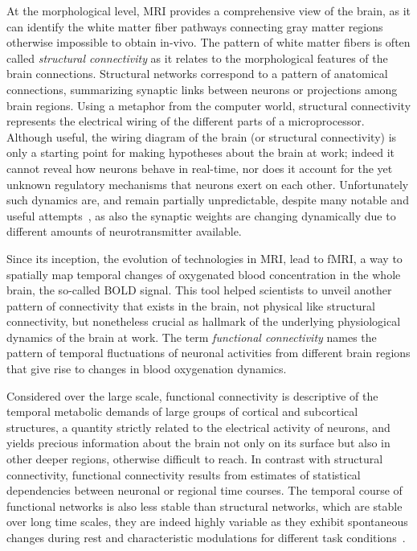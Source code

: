 At the morphological level, MRI provides a comprehensive view of the brain, as it can identify the white matter fiber pathways connecting gray matter regions otherwise impossible to obtain in-vivo. The pattern of white matter fibers is often called \emph{structural connectivity} as it relates to the morphological features of the brain connections. Structural networks correspond to a pattern of anatomical connections, summarizing synaptic links between neurons or projections among brain regions. Using a metaphor from the computer world, structural connectivity represents the electrical wiring of the different parts of a microprocessor. Although useful, the wiring diagram of the brain (or structural connectivity) is only a starting point for making hypotheses about the brain at work; indeed it cannot reveal how neurons behave in real-time, nor does it account for the yet unknown regulatory mechanisms that neurons exert on each other. Unfortunately such dynamics are, and remain partially unpredictable, despite many notable and useful attempts~\cite{deco2008}, as also the synaptic weights are changing dynamically due to different amounts of neurotransmitter available.

Since its inception, the evolution of technologies in MRI, lead to fMRI, a way to spatially map temporal changes of oxygenated blood concentration in the whole brain, the so-called BOLD signal. This tool helped scientists to unveil another pattern of connectivity that exists in the brain, not physical like structural connectivity, but nonetheless crucial as hallmark of the underlying physiological dynamics of the brain at work.
The term \emph{functional connectivity} names the pattern of temporal fluctuations of neuronal activities from different brain regions that give rise to changes in blood oxygenation dynamics.

Considered over the large scale, functional connectivity is descriptive of the temporal metabolic demands of large groups of cortical and subcortical structures, a quantity strictly related to the electrical activity of neurons, and yields precious information about the brain not only on its surface but also in other deeper regions, otherwise difficult to reach. In contrast with structural connectivity, functional connectivity results from estimates of statistical dependencies between neuronal or regional time courses. The temporal course of functional networks is also less stable than structural networks, which are stable over long time scales, they are indeed highly variable as they exhibit spontaneous changes during rest and characteristic modulations for different task conditions~\cite{honey2007,hutchison2013}.

